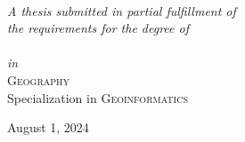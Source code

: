 \documentclass[
11pt, %
twoside, %
english, %
onehalfspacing, %
nolistspacing, %
liststotoc, %
parskip, %
headsepline, %
]{MastersDoctoralThesis} %
\begin{document}
\begin{titlepage}
\begin{center}
\begin{minipage}[t]{.4\textwidth}
\begin{flushright}
\end{flushright}
\end{minipage}\\
 
\vspace{1.6cm}

\large \emph{A thesis submitted in partial fulfillment of\\ the requirements for the degree of}\\[.4cm] %
{\color{hd-red}
    \textsc{\degreename
}}\\[.33cm]
\emph{in}\\[.33cm]
{\color{hd-red}
    \textsc{Geography}\\
    Specialization in \textsc{Geoinformatics}
}\\ %
 
\vfill

{\large August 1, 2024} %
 
\end{center}
\end{titlepage}


\end{document}
